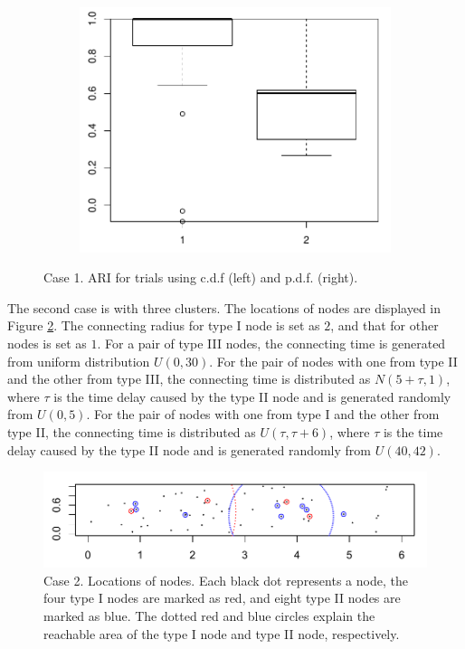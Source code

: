 \begin{figure}[H]
\begin{subfigure}{.5\textwidth}
\includegraphics[width=\linewidth]{../simulation/plots/boxplot_cdf_vs_pdf_case1.pdf}
\end{subfigure}
\caption{Case 1. ARI for trials using c.d.f (left) and p.d.f. (right).
}
\label{fig: ARI, case1}
\end{figure}




The second case is with three clusters.
The locations of nodes are displayed in Figure \ref{fig: nodes locations, case 2}.
The connecting radius for type I node is set as $2$, and that for other nodes is set as $1$. 
For a pair of type III nodes, the connecting time is generated from uniform distribution $U(0,30)$.
For the pair of nodes with one from type II and the other from type III, 
the connecting time is distributed as $N(5+\tau,1)$, where $\tau$ is the time delay caused by the type II node and is generated randomly from $U(0,5)$.
For the pair of nodes with one from type I and the other from type II, the connecting time is distributed as $U(\tau,\tau+6)$, where $\tau$ is the time delay caused by the type II node and is generated randomly from $U(40,42)$.

\begin{figure}[H]
\includegraphics[width=.8\linewidth]{../simulation/plots/nodes_2_108}
\caption{Case 2. Locations of nodes. Each black dot represents a node, the four type I nodes are marked as red, and eight type II nodes are marked as blue. The dotted red and blue circles explain the reachable area of the type I node and type II node, respectively. }
\label{fig: nodes locations, case 2}
\end{figure}

